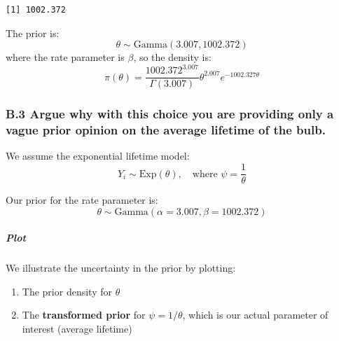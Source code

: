 \documentclass[
]{article}
\providecommand{\tightlist}{%
  \setlength{\itemsep}{0pt}\setlength{\parskip}{0pt}}
\begin{document}
\begin{verbatim}
[1] 1002.372
\end{verbatim}

The prior is: \[
\theta \sim \text{Gamma}(3.007, 1002.372)
\] where the rate parameter is \(\beta\), so the density is: \[
\pi(\theta) = \frac{1002.372^{3.007}}{\Gamma(3.007)} \theta^{2.007} e^{-1002.327\theta}
\]

\subsubsection{B.3 Argue why with this choice you are providing only a
vague prior opinion on the average lifetime of the
bulb.}\label{b.3-argue-why-with-this-choice-you-are-providing-only-a-vague-prior-opinion-on-the-average-lifetime-of-the-bulb.}

We assume the exponential lifetime model: \[
Y_i \sim \text{Exp}(\theta), \quad \text{where } \psi = \frac{1}{\theta}
\]

Our prior for the rate parameter is: \[
\theta \sim \text{Gamma}(\alpha = 3.007, \beta = 1002.372)
\]

\subparagraph{Plot}\label{plot}

We illustrate the uncertainty in the prior by plotting:

\begin{enumerate}
\def\labelenumi{\arabic{enumi}.}
\tightlist
\item
  The prior density for \(\theta\)
\item
  The \textbf{transformed prior} for \(\psi = 1/\theta\), which is our
  actual parameter of interest (average lifetime)
\end{enumerate}
\end{document}
